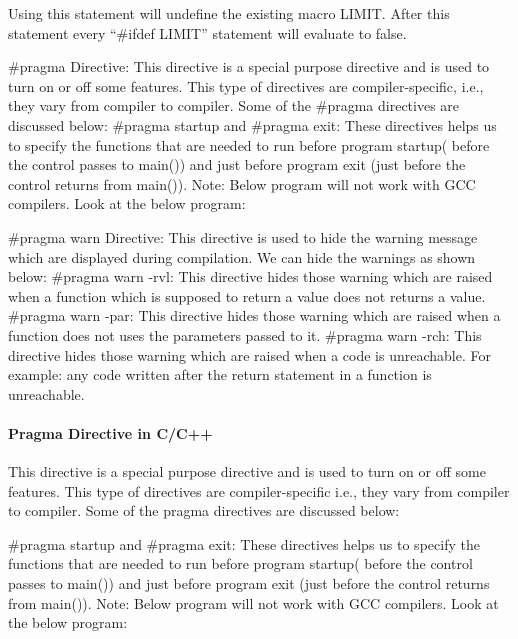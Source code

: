 \documentclass[12pt, a4paper]{article}
\begin{document}
    Using this statement will undefine the existing macro LIMIT. After this statement every “\#ifdef LIMIT” statement will evaluate to false. 

    \#pragma Directive: This directive is a special purpose directive and is used to turn on or off some features. This type of directives are compiler-specific, i.e., they vary from compiler to compiler. Some of the \#pragma directives are discussed below: 
    \#pragma startup and \#pragma exit: These directives helps us to specify the functions that are needed to run before program startup( before the control passes to main()) and just before program exit (just before the control returns from main()). 
    Note: Below program will not work with GCC compilers. 
    Look at the below program:


    \#pragma warn Directive: This directive is used to hide the warning message which are displayed during compilation. 
    We can hide the warnings as shown below: 
    \#pragma warn -rvl: This directive hides those warning which are raised when a function which is supposed to return a value does not returns a value.
    \#pragma warn -par: This directive hides those warning which are raised when a function does not uses the parameters passed to it.
    \#pragma warn -rch: This directive hides those warning which are raised when a code is unreachable. For example: any code written after the return statement in a function is unreachable.


    \paragraph{Pragma Directive in C/C++}
    This directive is a special purpose directive and is used to turn on or off some features. This type of directives are compiler-specific i.e., they vary from compiler to compiler. Some of the pragma directives are discussed below:
    
    \#pragma startup and \#pragma exit: These directives helps us to specify the functions that are needed to run before program startup( before the control passes to main()) and just before program exit (just before the control returns from main()).
    Note: Below program will not work with GCC compilers.
    Look at the below program:
    

\end{document}
